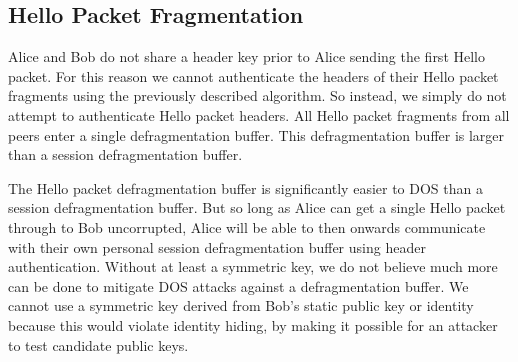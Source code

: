 \documentclass{article}
\begin{document}
\subsection{Hello Packet Fragmentation}

Alice and Bob do not share a header key prior to Alice sending the first Hello packet. For this reason we cannot authenticate the headers of their Hello packet fragments using the previously described algorithm. So instead, we simply do not attempt to authenticate Hello packet headers. All Hello packet fragments from all peers enter a single defragmentation buffer. This defragmentation buffer is larger than a session defragmentation buffer.

The Hello packet defragmentation buffer is significantly easier to DOS than a session defragmentation buffer. But so long as Alice can get a single Hello packet through to Bob uncorrupted, Alice will be able to then onwards communicate with their own personal session defragmentation buffer using header authentication. Without at least a symmetric key, we do not believe much more can be done to mitigate DOS attacks against a defragmentation buffer. We cannot use a symmetric key derived from Bob's static public key or identity because this would violate identity hiding, by making it possible for an attacker to test candidate public keys.
\end{document}
